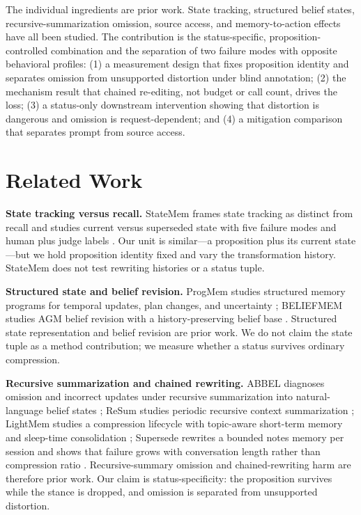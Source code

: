 \documentclass[11pt]{article}
\begin{document}
The individual ingredients are prior work. State tracking, structured belief
states, recursive-summarization omission, source access, and memory-to-action
effects have all been studied. The contribution is the status-specific,
proposition-controlled combination and the separation of two failure modes with
opposite behavioral profiles: (1) a measurement design that fixes proposition
identity and separates omission from unsupported distortion under blind
annotation; (2) the mechanism result that chained re-editing, not budget or call
count, drives the loss; (3) a status-only downstream intervention showing that
distortion is dangerous and omission is request-dependent; and (4) a mitigation
comparison that separates prompt from source access.

\section{Related Work}

\textbf{State tracking versus recall.} StateMem frames state tracking as distinct
from recall and studies current versus superseded state with five failure modes
and human plus judge labels \citep{statemen}. Our unit is similar---a proposition
plus its current state---but we hold proposition identity fixed and vary the
transformation history. StateMem does not test rewriting histories or a status
tuple.

\textbf{Structured state and belief revision.} ProgMem studies structured memory
programs for temporal updates, plan changes, and uncertainty \citep{progmem};
BELIEFMEM studies AGM belief revision with a history-preserving belief base
\citep{beliefmem}. Structured state representation and belief revision are prior
work. We do not claim the state tuple as a method contribution; we measure
whether a status survives ordinary compression.

\textbf{Recursive summarization and chained rewriting.} ABBEL diagnoses omission
and incorrect updates under recursive summarization into natural-language belief
states \citep{abbel}; ReSum studies periodic recursive context summarization
\citep{resum}; LightMem studies a compression lifecycle with topic-aware
short-term memory and sleep-time consolidation \citep{lightmem}; Supersede
rewrites a bounded notes memory per session and shows that failure grows with
conversation length rather than compression ratio \citep{supersede}.
Recursive-summary omission and chained-rewriting harm are therefore prior work.
Our claim is status-specificity: the proposition survives while the stance is
dropped, and omission is separated from unsupported distortion.
\end{document}
